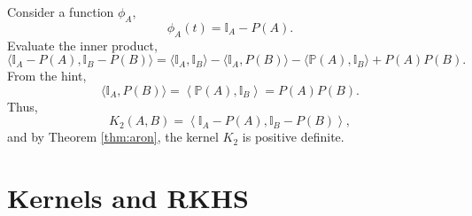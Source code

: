 \documentclass{article}[12pt]
\begin{document}
\begin{enumerate}
\begin{enumerate}
Consider a function $\phi_A$,
\begin{equation}
\phi_A (t) =  \mathbb I_A - P(A).
\end{equation}
Evaluate the inner product,
\begin{equation}
\langle \mathbb{I}_{A}-P(A), \mathbb{I}_{B}-P(B) \rangle = \langle \mathbb{I}_{A}, \mathbb{I}_{B} \rangle -  \langle \mathbb{I}_{A}, P(B) \rangle -  \langle \mathbb P(A), \mathbb{I}_{B} \rangle +  P(A) P(B).
\end{equation}
From the hint,
\begin{equation}
\langle \mathbb{I}_{A}, P(B) \rangle =\left\langle\mathbb{P}(A), \mathbb{I}_{B}\right\rangle=  P(A) P(B).
\end{equation}
Thus,
\begin{equation}
K_2(A, B) = \left\langle\mathbb{I}_{A}-P(A), \mathbb{I}_{B}-P(B)\right\rangle,
\end{equation}
and by Theorem \ref{thm:aron}, the kernel $K_2$ is positive definite.

\end{enumerate}
\end{enumerate}
\section{Kernels and RKHS}
\end{document}
